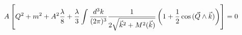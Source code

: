 \begin{equation}
\label{trentacinque}
A\left \lbrack  Q^2 +m^2 + A^2 {\lambda \over 8}
+ {\lambda \over 3} \int \frac {d^3 k}{(2\pi)^3} \frac{1}{2\sqrt{\vec k^2+M^2(\vec k)}}\left (1 + {1 \over 2} \cos {(  \vec Q  \wedge \vec k)}\right)
\right\rbrack=0
\end{equation}

